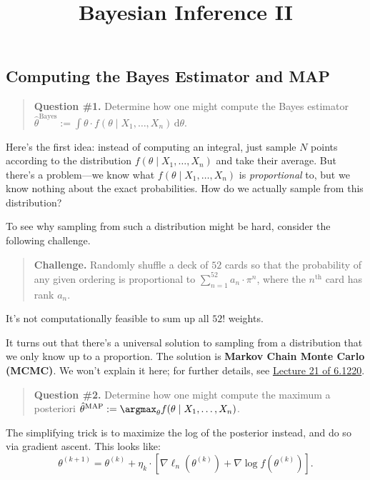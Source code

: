 \title{Bayesian Inference II}



\subsection{Computing the Bayes Estimator and MAP}

\begin{quote}
    \textbf{Question \#1.} Determine how one might compute the Bayes estimator
    $\hat{\theta}^{\text{Bayes}}
    := \int \theta \cdot f(\theta \mid X_1, \dots, X_n)
    \, \mathrm{d}\theta$.
\end{quote}

Here's the first idea:
instead of computing an integral,
just sample $N$ points according to the distribution
$f(\theta \mid X_1, \dots, X_n)$ and take their average.
But there's a problem---we know what $f(\theta \mid X_1, \dots, X_n)$
is \emph{proportional} to, but we know nothing
about the exact probabilities.
How do we actually sample from this distribution?

\begin{remark}
    To see why sampling from such a distribution might be hard,
    consider the following challenge.
    \begin{quote}
        \textbf{Challenge.} Randomly shuffle a deck of $52$ cards
        so that the probability of any given ordering
        is proportional to $\sum_{n = 1}^{52} a_n \cdot \pi^n$,
        where the $n^{\text{th}}$ card has rank $a_n$.
    \end{quote}
    It's not computationally feasible to sum up all $52!$ weights.
\end{remark}

It turns out that there's a universal solution
to sampling from a distribution that we only know up to a proportion.
The solution is \textbf{Markov Chain Monte Carlo (MCMC)}.
We won't explain it here; for further details, see
\href{/6.1220/lectures/21/}{Lecture 21 of 6.1220}.

\begin{quote}
    \textbf{Question \#2.}
    Determine how one might compute the maximum a posteriori
    $\hat{\theta}^{\text{MAP}} := \argmax_{\theta}
    f(\theta \mid X_1, \dots, X_n)$.
\end{quote}

The simplifying trick is to maximize the log of the posterior instead,
and do so via gradient ascent.  This looks like:
\[ \theta^{(k + 1)} = \theta^{(k)} +
\eta_k \cdot \left[
    \nabla \ell_n(\theta^{(k)}) + \nabla \log f(\theta^{(k)})
\right]. \]

